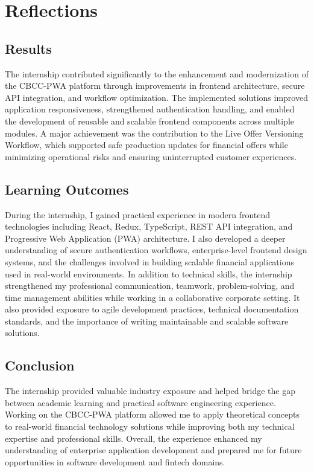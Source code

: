 \chapter{Reflections}

\section{Results}

The internship contributed significantly to the enhancement and modernization of the CBCC-PWA platform through improvements in frontend architecture, secure API integration, and workflow optimization. The implemented solutions improved application responsiveness, strengthened authentication handling, and enabled the development of reusable and scalable frontend components across multiple modules. A major achievement was the contribution to the Live Offer Versioning Workflow, which supported safe production updates for financial offers while minimizing operational risks and ensuring uninterrupted customer experiences.

\section{Learning Outcomes}

During the internship, I gained practical experience in modern frontend technologies including React, Redux, TypeScript, REST API integration, and Progressive Web Application (PWA) architecture. I also developed a deeper understanding of secure authentication workflows, enterprise-level frontend design systems, and the challenges involved in building scalable financial applications used in real-world environments. In addition to technical skills, the internship strengthened my professional communication, teamwork, problem-solving, and time management abilities while working in a collaborative corporate setting. It also provided exposure to agile development practices, technical documentation standards, and the importance of writing maintainable and scalable software solutions.

\section{Conclusion}

The internship provided valuable industry exposure and helped bridge the gap between academic learning and practical software engineering experience. Working on the CBCC-PWA platform allowed me to apply theoretical concepts to real-world financial technology solutions while improving both my technical expertise and professional skills. Overall, the experience enhanced my understanding of enterprise application development and prepared me for future opportunities in software development and fintech domains.